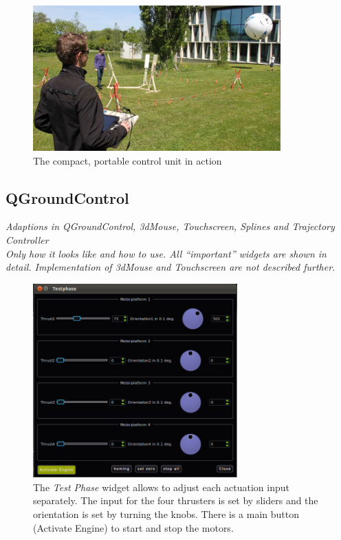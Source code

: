 \begin{figure}[H]
	\begin{center}
		\includegraphics[width=0.85\textwidth]{graphics/HMI_in_Action}
		\caption{The compact, portable control unit in action}  
		\label{fig:HMI_in_Action}
	\end{center}
\end{figure}



\subsection{QGroundControl}
\label{subsec:qGroundControl}
\textit{Adaptions in QGroundControl, 3dMouse, Touchscreen, Splines and Trajectory Controller \\ Only how it looks like and how to use. All ``important'' widgets are shown in detail. Implementation of 3dMouse and Touchscreen are not described further.}


\begin{figure}[H] %
	\begin{center}
		\includegraphics[width=0.7\textwidth]{qgc_test_phase}
		\caption[Test Phase realization]{The \textit{Test Phase} widget allows to adjust each actuation input separately. The input for the four thrusters is set by sliders and the orientation is set by turning the knobs. There is a main button (Activate Engine) to start and stop the motors.}  
		\label{figure:qgc_test_phase}
	\end{center}
\end{figure}

